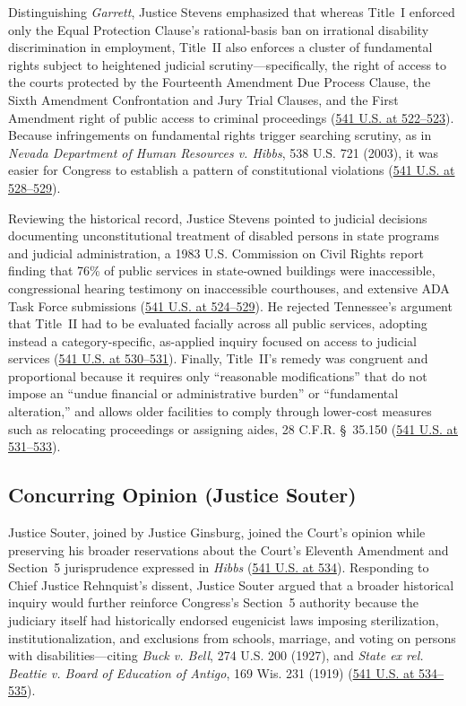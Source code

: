\documentclass[12pt]{article}
\begin{document}
Distinguishing \textit{Garrett}, Justice Stevens emphasized that whereas Title~I enforced only the Equal Protection Clause's rational-basis ban on irrational disability discrimination in employment, Title~II also enforces a cluster of fundamental rights subject to heightened judicial scrutiny---specifically, the right of access to the courts protected by the Fourteenth Amendment Due Process Clause, the Sixth Amendment Confrontation and Jury Trial Clauses, and the First Amendment right of public access to criminal proceedings (\href{https://www.law.cornell.edu/supremecourt/text/541/509}{541 U.S. at 522--523}). Because infringements on fundamental rights trigger searching scrutiny, as in \textit{Nevada Department of Human Resources v. Hibbs}, 538 U.S. 721 (2003), it was easier for Congress to establish a pattern of constitutional violations (\href{https://www.law.cornell.edu/supremecourt/text/541/509}{541 U.S. at 528--529}).

Reviewing the historical record, Justice Stevens pointed to judicial decisions documenting unconstitutional treatment of disabled persons in state programs and judicial administration, a 1983 U.S. Commission on Civil Rights report finding that 76\% of public services in state-owned buildings were inaccessible, congressional hearing testimony on inaccessible courthouses, and extensive ADA Task Force submissions (\href{https://www.law.cornell.edu/supremecourt/text/541/509}{541 U.S. at 524--529}). He rejected Tennessee's argument that Title~II had to be evaluated facially across all public services, adopting instead a category-specific, as-applied inquiry focused on access to judicial services (\href{https://www.law.cornell.edu/supremecourt/text/541/509}{541 U.S. at 530--531}). Finally, Title~II's remedy was congruent and proportional because it requires only ``reasonable modifications'' that do not impose an ``undue financial or administrative burden'' or ``fundamental alteration,'' and allows older facilities to comply through lower-cost measures such as relocating proceedings or assigning aides, 28 C.F.R. \S~35.150 (\href{https://www.law.cornell.edu/supremecourt/text/541/509}{541 U.S. at 531--533}).

\subsection{Concurring Opinion (Justice Souter)}
Justice Souter, joined by Justice Ginsburg, joined the Court's opinion while preserving his broader reservations about the Court's Eleventh Amendment and Section~5 jurisprudence expressed in \textit{Hibbs} (\href{https://www.law.cornell.edu/supremecourt/text/541/509}{541 U.S. at 534}). Responding to Chief Justice Rehnquist's dissent, Justice Souter argued that a broader historical inquiry would further reinforce Congress's Section~5 authority because the judiciary itself had historically endorsed eugenicist laws imposing sterilization, institutionalization, and exclusions from schools, marriage, and voting on persons with disabilities---citing \textit{Buck v. Bell}, 274 U.S. 200 (1927), and \textit{State ex rel. Beattie v. Board of Education of Antigo}, 169 Wis. 231 (1919) (\href{https://www.law.cornell.edu/supremecourt/text/541/509}{541 U.S. at 534--535}).
\end{document}
